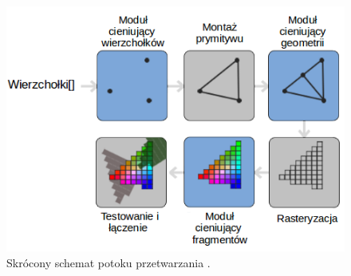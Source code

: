 \begin{figure}[H]
		\centering
 		\includegraphics[width=11.5cm]{pipeline.png}
    	\caption{Skrócony schemat potoku przetwarzania \cite{opengltutorial}.}
 		\label{rys8}
\end{figure}
